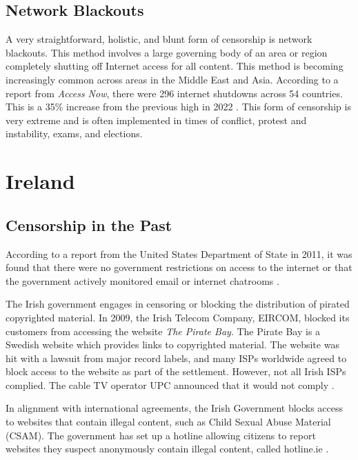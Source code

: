 \subsection{Network Blackouts}

A very straightforward, holistic, and blunt form of censorship is network blackouts. This method involves a large governing body of an area or region completely shutting off Internet access for all content. This method is becoming increasingly common across areas in the Middle East and Asia. According to a report from \textit{Access Now}, there were 296 internet shutdowns across 54 countries. This is a 35\% increase from the previous high in 2022 \cite{inetenetBlackouts}. This form of censorship is very extreme and is often implemented in times of conflict, protest and instability, exams, and elections. 

\section{Ireland}
\label{sec:Ireland-Censorship}

\subsection{Censorship in the Past}

According to a report from the United States Department of State in 2011, it was found that there were no government restrictions on access to the internet or that the government actively monitored email or internet chatrooms \cite{stateTechnicalDifficulties}.

The Irish government engages in censoring or blocking the distribution of pirated copyrighted material. In 2009, the Irish Telecom Company, EIRCOM, blocked its customers from accessing the website \textit{The Pirate Bay}. The Pirate Bay is a Swedish website which provides links to copyrighted material. The website was hit with a lawsuit from major record labels, and many ISPs worldwide agreed to block access to the website as part of the settlement. However, not all Irish ISPs complied. The cable TV operator UPC announced that it would not comply \cite{irishtimesEircomBlock}. 

In alignment with international agreements, the Irish Government blocks access to websites that contain illegal content, such as Child Sexual Abuse Material (CSAM). The government has set up a hotline allowing citizens to report websites they suspect anonymously contain illegal content, called hotline.ie \cite{hotlineAboutx2013}.


